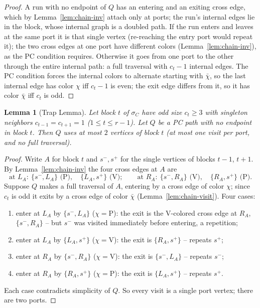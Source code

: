\documentclass[11pt]{article}
\newtheorem{lemma}[theorem]{Lemma}
\theoremstyle{definition}
\begin{document}
\begin{proof}
A run with no endpoint of $Q$ has an entering and an exiting cross edge, which by
Lemma~\ref{lem:chain-inv} attach only at ports; the run's internal edges lie in the
block, whose internal graph is a doubled path. If the run enters and leaves at the same
port it is that single vertex (re-reaching the entry port would repeat it); the two
cross edges at one port have different colors (Lemma~\ref{lem:chain-inv}), as the PC
condition requires. Otherwise it goes from one port to the other through the entire
internal path: a full traversal with $c_t - 1$ internal edges. The PC condition forces
the internal colors to alternate starting with $\bar\chi$, so the last internal edge has
color $\chi$ iff $c_t - 1$ is even; the exit edge differs from it, so it has color
$\bar\chi$ iff $c_t$ is odd.
\end{proof}

\begin{lemma}[Trap Lemma]\label{lem:trap}
Let block $t$ of $\sigma_C$ have odd size $c_t \ge 3$ with singleton neighbors
$c_{t-1} = c_{t+1} = 1$ ($1 \le t \le r-1$). Let $Q$ be a PC path with no endpoint in
block $t$. Then $Q$ uses at most $2$ vertices of block $t$ (at most one visit per port,
and no full traversal).
\end{lemma}

\begin{proof}
Write $A$ for block $t$ and $s^-, s^+$ for the single vertices of blocks $t-1$, $t+1$.
By Lemma~\ref{lem:chain-inv} the four cross edges at $A$ are
\[
\text{at } L_A:\ \{s^-, L_A\} \text{ (P)}, \quad \{L_A, s^+\} \text{ (V)};
\qquad
\text{at } R_A:\ \{s^-, R_A\} \text{ (V)}, \quad \{R_A, s^+\} \text{ (P)}.
\]
Suppose $Q$ makes a full traversal of $A$, entering by a cross edge of color $\chi$;
since $c_t$ is odd it exits by a cross edge of color $\bar\chi$
(Lemma~\ref{lem:chain-visit}). Four cases:
\begin{enumerate}
\item enter at $L_A$ by $\{s^-, L_A\}$ ($\chi = \mathrm P$): the exit is the V-colored
cross edge at $R_A$, $\{s^-, R_A\}$ -- but $s^-$ was visited immediately before
entering, a repetition;
\item enter at $L_A$ by $\{L_A, s^+\}$ ($\chi = \mathrm V$): the exit is
$\{R_A, s^+\}$ -- repeats $s^+$;
\item enter at $R_A$ by $\{s^-, R_A\}$ ($\chi = \mathrm V$): the exit is
$\{s^-, L_A\}$ -- repeats $s^-$;
\item enter at $R_A$ by $\{R_A, s^+\}$ ($\chi = \mathrm P$): the exit is
$\{L_A, s^+\}$ -- repeats $s^+$.
\end{enumerate}
Each case contradicts simplicity of $Q$. So every visit is a single port vertex; there
are two ports.
\end{proof}
\end{document}
